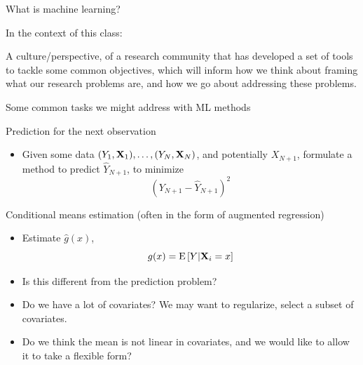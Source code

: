 \documentclass[xcolor={dvipsnames}, handout]{beamer}
\begin{document}



\begin{frame}{What is machine learning?}

In the context of this class:\pause

\begin{wideitemize}
\item A culture/perspective, \pause of a research community that has developed a set of tools to tackle some common objectives, \pause which will inform how we think about framing what our research problems are, and how we go about addressing these problems. 
\end{wideitemize}

\end{frame}





\begin{frame}{Some common tasks we might address with ML methods}
\pause
\begin{wideitemize}
\item Prediction for the next observation \pause
\begin{itemize}
\item Given some data $(Y_1, \mathbf{X}_1), \dots, (Y_N, \mathbf{X}_N)$, and potentially $X_{N+1}$, formulate a method to predict $\hat{Y}_{N+1}$, to minimize
\[
\left(Y_{N+1} - \hat{Y}_{N+1}\right)^2
\]
\end{itemize}
\pause
\item Conditional means estimation \pause (often in the form of augmented regression)\pause
\begin{itemize}
\item Estimate $\hat g(x)$, 
\[
g(x) = {\textrm E}\,[Y | \mathbf{X}_i = x]
\]\pause
\item Is this different from the prediction problem? \pause
\item Do we have a lot of covariates? We may want to regularize, select a subset of covariates. \pause
\item Do we think the mean is not linear in covariates, and we would like to allow it to take a flexible form? 
\end{itemize}
\end{wideitemize}

\end{frame}
\end{document}
